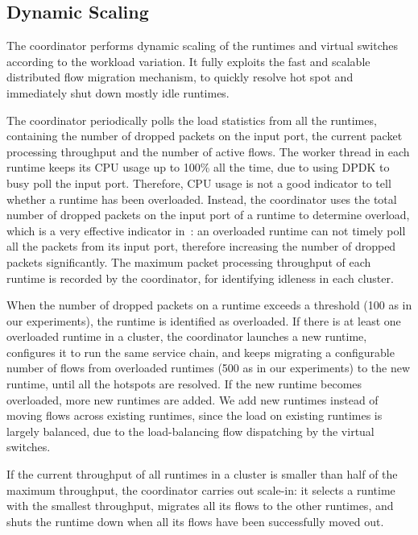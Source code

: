 \subsection{Dynamic Scaling}
\label{sec:scaling}

The coordinator performs dynamic scaling of the runtimes and virtual switches according to the workload variation. It fully exploits the fast and scalable distributed flow migration mechanism, to quickly resolve hot spot and immediately shut down mostly idle runtimes.

The coordinator periodically polls the load statistics from all the runtimes, containing the number of dropped packets on the input port, the current packet processing throughput and the number of active flows.
The worker thread in each runtime keeps its CPU usage up to 100\% all the time, due to using DPDK to busy poll the input port. %
 Therefore, CPU usage is not a good indicator to tell whether a runtime has been overloaded. Instead, the coordinator uses the total number of dropped packets on the input port of a runtime to determine overload, which is a very effective indicator in~\nfactor: an overloaded runtime can not timely poll all the packets from its input port, therefore increasing the number of dropped packets significantly. The maximum packet processing throughput of each runtime is recorded by the coordinator, for identifying idleness in each cluster. %

When the number of dropped packets on a runtime exceeds a threshold (100 as in our experiments), the runtime is identified as overloaded. If there is at least one overloaded runtime in a cluster, the coordinator launches a new runtime, configures it to run the same service chain, and keeps migrating a configurable number of flows from overloaded runtimes (500 as in our experiments) to the new runtime, until all the hotspots are resolved. If the new runtime becomes overloaded, more new runtimes are added. We add new runtimes instead of moving flows across existing runtimes, since the load on existing runtimes is largely balanced, due to the load-balancing flow dispatching by the virtual switches.

If the current throughput of all runtimes in a cluster is smaller than half of the maximum throughput, the coordinator carries out scale-in: it selects a runtime with the smallest throughput, migrates all its flows to the other runtimes, and shuts the runtime down when all its flows have been successfully moved out.

